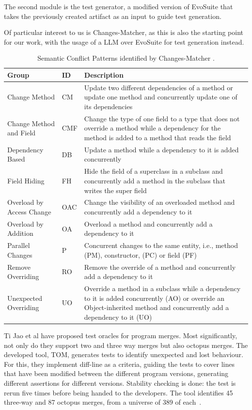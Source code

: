 The second module is the test generator, a modified version of EvoSuite that takes the previously created artifact as an input to guide test generation.

Of particular interest to us is Changes-Matcher, as this is also the starting point for our work, with the usage of a LLM over EvoSuite for test generation instead.

\begin{table}[!h]
\setlength\extrarowheight{2pt}
\begin{tabularx}{\textwidth}{|l|l|X|}
 \hline
 Group & ID & Description \\ [0.5ex] 
 \hline\hline
 Change Method  & CM & Update two different dependencies of a method or update one method and concurrently update one of its
dependencies \\ 
 \hline
 Change Method
and Field & CMF & Change the type of one field to a type that does not
override a method while a dependency for the method
is added to a method that reads the field
 \\
 \hline
 Dependency
Based & DB & Update a method while a dependency to it is added
concurrently \\
 \hline
 Field Hiding & FH & Hide the field of a superclass in a subclass and concurrently add a method in the subclass that writes the
super field
 \\
 \hline
 Overload by Access Change & OAC & Change the visibility of an overloaded method and
concurrently add a dependency to it \\ 
 \hline
 Overload by Addition & OA & Overload a method and concurrently add a dependency to it \\  
 \hline
 Parallel Changes & P & Concurrent changes to the same entity, i.e., method
(PM), constructor, (PC) or field (PF) \\ 
 \hline
 Remove Overriding & RO & Remove the override of a method and concurrently
add a dependency to it \\  
  \hline
 Unexpected Overriding & UO & Override a method in a subclass while a dependency to it is added concurrently (AO) or override an
Object-inherited method and concurrently add a dependency to it (UO) \\ [1ex] 
 \hline
\end{tabularx}
\caption{\label{table:pattern-table}Semantic Conflict Patterns identified by Changes-Matcher \citep{kn:nuno}.}
\end{table}


Ti Jao et al have proposed test oracles for program merges. Most significantly, not only do they support two and three way merges but also octopus merges. The developed tool, TOM, generates tests to identify unexpected and lost behaviour. For this, they implement diff-line as a criteria, guiding the tests to cover lines that have been modified between the different program versions, generating different assertions for different versions. Stability checking is done: the test is rerun five times before being handed to the developers. The tool identifies 45 three-way and 87 octopus merges, from a universe of 389 of each~\citep{kn:ji2022}.


